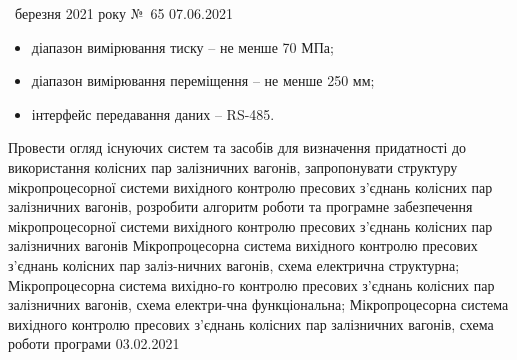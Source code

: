 \begin{assignment}%
{\guillemotright~березня 2021 року №~65}
%
{07.06.2021}
%
{\begin{itemize}
\item {діапазон вимірювання тиску – не менше 70 МПа;}
\item {діапазон вимірювання переміщення – не менше 250 мм;}
\item {інтерфейс передавання даних – RS-485.}
\end{itemize}}
%
{Провести огляд існуючих систем та засобів для визначення придатності до використання колісних пар залізничних вагонів, запропонувати структуру мікропроцесорної системи вихідного контролю пресових з’єднань колісних пар залізничних вагонів, розробити алгоритм роботи та програмне забезпечення мікропроцесорної системи вихідного контролю пресових з’єднань колісних пар залізничних вагонів}
%
{Мікропроцесорна система вихідного контролю пресових з’єднань колісних пар заліз-ничних вагонів, схема електрична структурна; Мікропроцесорна система вихідно-го контролю пресових з’єднань колісних пар залізничних вагонів, схема електри-чна функціональна; Мікропроцесорна система вихідного контролю пресових з’єднань колісних пар залізничних вагонів, схема роботи програми}
%
{
}
%
{03.02.2021}
%
{
}
%
\end{assignment} 